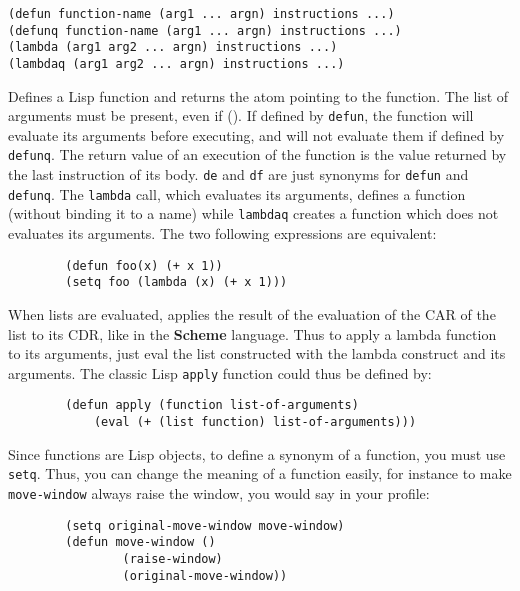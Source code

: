         
{\usagefont\begin{verbatim}
(defun function-name (arg1 ... argn) instructions ...)
(defunq function-name (arg1 ... argn) instructions ...)
(lambda (arg1 arg2 ... argn) instructions ...)
(lambdaq (arg1 arg2 ... argn) instructions ...)
\end{verbatim}}\usageupspace

Defines a Lisp function and returns the atom pointing to the function. The
list of arguments must be present, even if ().  If defined by \verb"defun",
the function will evaluate its arguments before executing, and will not
evaluate them if defined by \verb"defunq". The return value of an execution
of the function is the value returned by the last instruction of its body.
\verb"de" and \verb"df" are just synonyms for \verb"defun" and
\verb"defunq". The \verb"lambda" call, which evaluates its arguments,
defines a function (without binding it to a name) while \verb"lambdaq"
creates a function which does not evaluates its arguments. The two following
expressions are equivalent:

{\exemplefont\begin{verbatim} 
        (defun foo(x) (+ x 1))
        (setq foo (lambda (x) (+ x 1)))
\end{verbatim}}

When lists are evaluated, {\WOOL} applies the result of the evaluation of
the CAR of the list to its CDR, like in the {\bf Scheme} language. Thus to
apply a lambda function to its arguments, just eval the list constructed
with the lambda construct and its arguments. The classic Lisp {\tt apply}
function could thus be defined by:

{\exemplefont\begin{verbatim}
        (defun apply (function list-of-arguments)
            (eval (+ (list function) list-of-arguments)))
\end{verbatim}}

Since functions are Lisp objects, to define a synonym of a function, you must
use \verb"setq". Thus, you can change the meaning of a function easily, for
instance to make \verb"move-window" always raise the window, you would say
in your profile:

{\exemplefont\begin{verbatim}
        (setq original-move-window move-window)
        (defun move-window () 
                (raise-window)
                (original-move-window))
\end{verbatim}}

